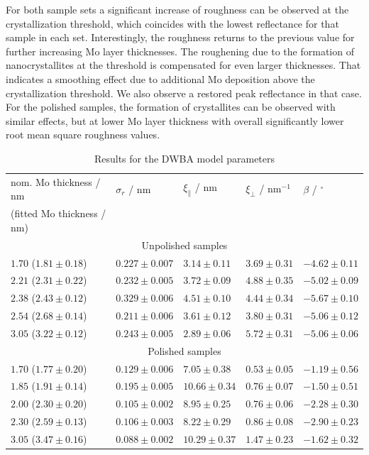 For both sample sets a significant increase of roughness can be observed at the crystallization threshold, which coincides with the lowest reflectance for that sample in each set. Interestingly, the roughness returns to the previous value for further increasing Mo layer thicknesses. The roughening due to the formation of nanocrystallites at the threshold is compensated for even larger thicknesses.
That indicates a smoothing effect due to additional Mo deposition above the crystallization threshold. We also observe a restored peak reflectance in that case. For the polished samples, the formation of crystallites can be observed with similar effects, but at lower Mo layer thickness with overall significantly lower root mean square roughness values.

\begin{table}
\centering
\caption{Results for the DWBA model parameters}
\label{tbl:diffuse_parameters_results}
\begin{tabular}{@{}lllll@{}}
\toprule
nom. Mo thickness / nm&$\sigma_r$ / nm & $\xi_\parallel$ / nm & $\xi_\perp$  / nm$^{-1}$ & $\beta$ / $^\circ$ \\ 
(fitted Mo thickness / nm) & & & &\\ \midrule
\multicolumn{5}{c}{Unpolished samples}\\
\midrule
$1.70$ ($1.81 \pm 0.18$) & $0.227 \pm 0.007$ & $3.14 \pm 0.11$ & $3.69 \pm 0.31$ & $-4.62 \pm 0.11$ \\
$2.21$ ($2.31 \pm 0.22$)& $0.232 \pm 0.005$ & $3.72 \pm 0.09$ & $4.88 \pm 0.35$ & $-5.02 \pm 0.09$ \\
$2.38$ ($2.43 \pm 0.12$) & $0.329 \pm 0.006$ & $4.51 \pm 0.10$ & $4.44 \pm 0.34$ & $-5.67 \pm 0.10$ \\
$2.54$ ($2.68 \pm 0.14$)& $0.211 \pm 0.006$ & $3.61 \pm 0.12$ & $3.80 \pm 0.31$ & $-5.06 \pm 0.12$ \\
$3.05$ ($3.22 \pm 0.12$)& $0.243 \pm 0.005$ & $2.89 \pm 0.06$ & $5.72 \pm 0.31$ & $-5.06 \pm 0.06$ \\
\midrule
\multicolumn{5}{c}{Polished samples}\\
\midrule
$1.70$ ($1.77 \pm 0.20$) & $0.129 \pm 0.006$ & $7.05 \pm 0.38$ & $0.53 \pm 0.05$ & $-1.19 \pm 0.56$ \\
$1.85$ ($1.91 \pm 0.14$)& $0.195 \pm 0.005$ & $10.66 \pm 0.34$ & $0.76 \pm 0.07$ & $-1.50 \pm 0.51$ \\
$2.00$ ($2.30 \pm 0.20$)& $0.105 \pm 0.002$ & $8.95 \pm 0.25$ & $0.76 \pm 0.06$ & $-2.28 \pm 0.30$ \\
$2.30$ ($2.59 \pm 0.13$)& $0.106 \pm 0.003$ & $8.22 \pm 0.29$ & $0.86 \pm 0.08$ & $-2.90 \pm 0.23$ \\
$3.05$ ($3.47 \pm 0.16$)& $0.088 \pm 0.002$ & $10.29 \pm 0.37$ & $1.47 \pm 0.23$ & $-1.62 \pm 0.32$ \\
 \bottomrule
\end{tabular}
\end{table}

